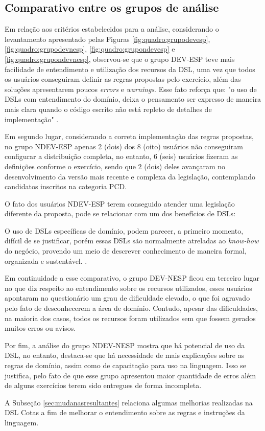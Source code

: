 \subsection{Comparativo entre os grupos de análise}
\label{sec:comparativogrupos}

Em relação aos critérios estabelecidos para a análise, considerando o levantamento apresentado pelas Figuras \ref{fig:quadro:grupodevesp}, \ref{fig:quadro:grupodevnesp}, \ref{fig:quadro:grupondevesp} e \ref{fig:quadro:grupondevnesp}, observou-se que o grupo DEV-ESP teve mais facilidade de entendimento e utilização dos recursos da DSL, uma vez que todos os usuários conseguiram definir as regras propostas pelo exercício, além das soluções apresentarem poucos \textit{errors} e \textit{warnings}. Esse fato reforça que: "o uso de DSLs com entendimento do domínio, deixa o pensamento ser expresso de maneira mais clara quando o código escrito não está repleto de detalhes de implementação"  \cite[p.41, tradução nossa]{dslengineering}.

Em segundo lugar, considerando a correta implementação das regras propostas, no grupo NDEV-ESP apenas 2 (dois) dos 8 (oito) usuários não conseguiram configurar a distribuição completa, no entanto, 6 (seis) usuários fizeram as definições conforme o exercício, sendo que 2 (dois) deles avançaram no desenvolvimento da versão mais recente e complexa da legislação, contemplando candidatos inscritos na categoria PCD. 

O fato dos usuários NDEV-ESP terem conseguido atender uma legislação diferente da proposta, pode se relacionar com um dos benefícios de DSLs: 

\begin{citacao}
O uso de DSLs específicas de domínio, podem parecer, a primeiro momento, difícil de se justificar, porém essas DSLs são normalmente atreladas ao \textit{know-how} do negócio, provendo um meio de descrever conhecimento de maneira formal, organizada e sustentável. \cite[p.43, tradução nossa]{dslengineering}.
\end{citacao}

Em continuidade a esse comparativo, o grupo DEV-NESP ficou em terceiro lugar no que diz respeito ao entendimento sobre os recursos utilizados, esses usuários apontaram no questionário um grau de dificuldade elevado, o que foi agravado pelo fato de desconhecerem a área de domínio. Contudo, apesar das dificuldades, na maioria dos casos, todos os recursos foram utilizados sem que fossem gerados muitos erros ou avisos. 

Por fim, a análise do grupo NDEV-NESP mostra que há potencial de uso da DSL, no entanto, destaca-se que há necessidade de mais explicações sobre as regras de domínio, assim como de capacitação para uso na linguagem. Isso se justifica, pelo fato de que esse grupo apresentou maior quantidade de erros além de alguns exercícios terem sido entregues de forma incompleta. 

A Subseção \ref{sec:mudanasresultantes} relaciona algumas melhorias realizadas na DSL Cotas a fim de melhorar o entendimento sobre as regras e instruções da linguagem.
